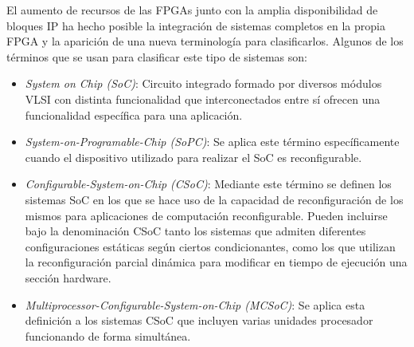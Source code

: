 El aumento de recursos de las FPGAs junto con la amplia disponibilidad
de bloques IP ha hecho posible la integración de sistemas completos en
la propia FPGA y la aparición de una nueva terminología para
clasificarlos. Algunos de los términos que se usan para clasificar
este tipo de sistemas son:

\begin {itemize}
\item \textit{System on Chip (SoC)}: Circuito integrado formado por
  diversos módulos VLSI con distinta funcionalidad que interconectados
  entre sí ofrecen una funcionalidad específica para una aplicación.
\item \textit{System-on-Programable-Chip (SoPC)}: Se aplica este
  término específicamente cuando el dispositivo utilizado para
  realizar el SoC es reconfigurable.
\item \textit{Configurable-System-on-Chip (CSoC)}: Mediante este
  término se definen los sistemas SoC en los que se hace uso de la
  capacidad de reconfiguración de los mismos para aplicaciones de
  computación reconfigurable. Pueden incluirse bajo la denominación
  CSoC tanto los sistemas que admiten diferentes configuraciones
  estáticas según ciertos condicionantes, como los que utilizan la
  reconfiguración parcial dinámica para modificar en tiempo de
  ejecución una sección hardware.
\item \textit{Multiprocessor-Configurable-System-on-Chip (MCSoC)}: Se
  aplica esta definición a los sistemas CSoC que incluyen varias
  unidades procesador funcionando de forma simultánea.
\end {itemize}

